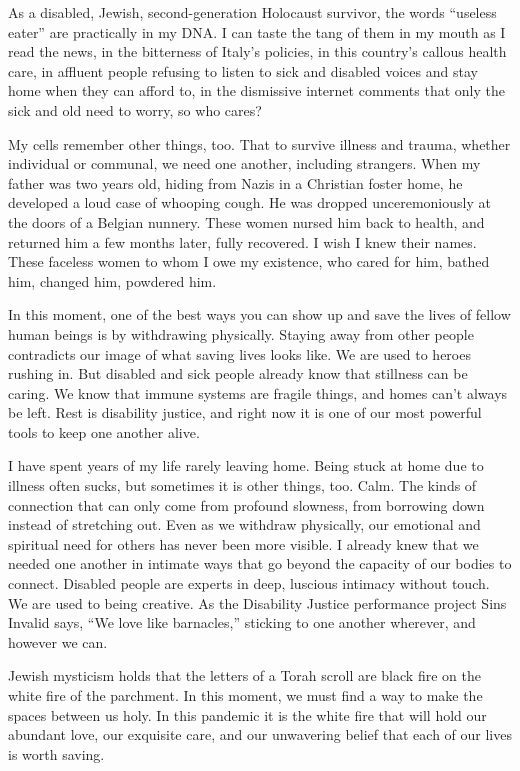 As a disabled, Jewish, second-generation Holocaust survivor, the words
``useless eater'' are practically in my DNA. I can taste the tang of
them in my mouth as I read the news, in the bitterness of Italy's
policies, in this country's callous health care, in affluent people
refusing to listen to sick and disabled voices and stay home when they
can afford to, in the dismissive internet comments that only the sick
and old need to worry, so who cares?

My cells remember other things, too. That to survive illness and trauma,
whether individual or communal, we need one another, including
strangers. When my father was two years old, hiding from Nazis in a
Christian foster home, he developed a loud case of whooping cough. He
was dropped unceremoniously at the doors of a Belgian nunnery. These
women nursed him back to health, and returned him a few months later,
fully recovered. I wish I knew their names. These faceless women to whom
I owe my existence, who cared for him, bathed him, changed him, powdered
him.

In this moment, one of the best ways you can show up and save the lives
of fellow human beings is by withdrawing physically. Staying away from
other people contradicts our image of what saving lives looks like. We
are used to heroes rushing in. But disabled and sick people already know
that stillness can be caring. We know that immune systems are fragile
things, and homes can't always be left. Rest is disability justice, and
right now it is one of our most powerful tools to keep one another
alive.

I have spent years of my life rarely leaving home. Being stuck at home
due to illness often sucks, but sometimes it is other things, too. Calm.
The kinds of connection that can only come from profound slowness, from
borrowing down instead of stretching out. Even as we withdraw
physically, our emotional and spiritual need for others has never been
more visible. I already knew that we needed one another in intimate ways
that go beyond the capacity of our bodies to connect. Disabled people
are experts in deep, luscious intimacy without touch. We are used to
being creative. As the Disability Justice performance project Sins
Invalid says, ``We love like barnacles,'' sticking to one another
wherever, and however we can.

Jewish mysticism holds that the letters of a Torah scroll are black fire
on the white fire of the parchment. In this moment, we must find a way
to make the spaces between us holy. In this pandemic it is the white
fire that will hold our abundant love, our exquisite care, and our
unwavering belief that each of our lives is worth saving.

